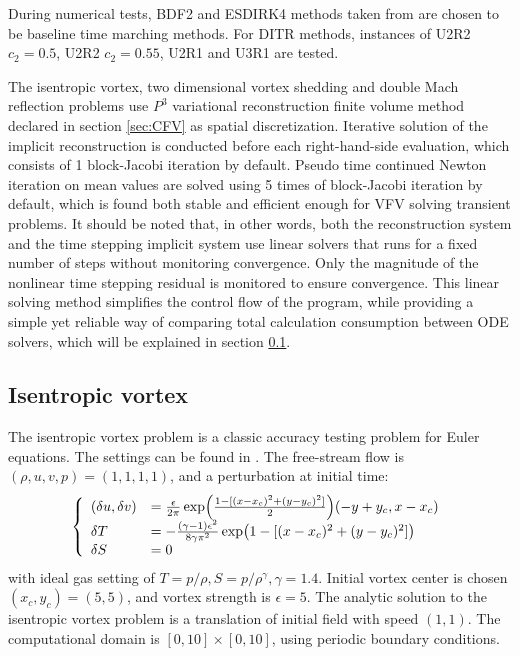 During numerical tests,
BDF2 and ESDIRK4 methods taken from
\cite{bijl2002implicitBDFvESDIRK,kennedy2003additiveARK}
are chosen to be
baseline time marching methods.
For DITR methods, instances of
U2R2 $c_2 = 0.5$, U2R2 $c_2 = 0.55$, U2R1 and U3R1 are tested.

The isentropic vortex, two dimensional vortex shedding
and  double Mach reflection problems use
$P^3$ variational reconstruction finite volume method declared in
section \ref{sec:CFV} as spatial  discretization.
Iterative solution of the implicit reconstruction
is conducted before each right-hand-side evaluation,
which consists of 1 block-Jacobi iteration by default.
Pseudo time continued Newton iteration on mean values are
solved using 5 times of block-Jacobi iteration by default,
which is found both stable and efficient enough for VFV solving
transient problems.
It should be noted that, in other words,
both the reconstruction system and
the time stepping implicit system use linear solvers that
runs for a fixed number of steps without monitoring convergence.
Only the magnitude of the nonlinear time stepping residual
is monitored to ensure convergence.
This linear solving method simplifies the control flow of
the program,
while providing a simple yet reliable way of
comparing total calculation consumption between ODE solvers,
which will be explained in section \ref{ssec:resultIV}.



\subsection{Isentropic vortex}
\label{ssec:resultIV}

The isentropic vortex problem is a classic
accuracy testing problem for Euler equations.
The settings can be found in \cite{hu1999weighted_WENO}.
The free-stream flow is $(\rho,u,v,p)=(1,1,1,1)$,
and a perturbation at initial time:
\begin{equation}
    \left\{
    \begin{array}[2]{ll}
        (\delta u, \delta v) & = \frac{\epsilon}{2\pi}\exp(\frac{1-[(x-x_c)^2+(y-y_c)^2]}{2})(-y+y_c,x-x_c) \\
        \delta T             & = - \frac{(\gamma-1)\epsilon^2}{8\gamma\pi^2}\exp(1-[(x-x_c)^2+(y-y_c)^2])   \\
        \delta S             & = 0                                                                          \\
    \end{array}
    \right.
\end{equation}
with ideal gas setting of $T = p/\rho, S= p/\rho^\gamma, \gamma =1.4$.
Initial vortex center is chosen $(x_c,y_c)=(5,5)$,
and vortex strength is $\epsilon = 5$.
The analytic solution to the isentropic vortex problem is a
translation of initial field with speed $(1,1)$.
The computational domain is $[0,10]\times[0,10]$,
using periodic boundary conditions.

